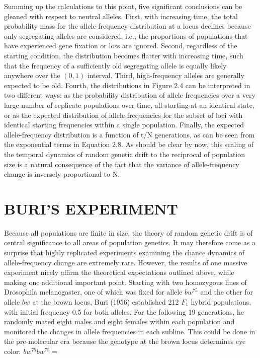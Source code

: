 \documentclass{article}
\begin{document}
Summing up the calculations to this point, five significant conclusions can be gleaned with respect to neutral alleles. First, with increasing time, the total probability mass for the allele-frequency distribution at a locus declines because only segregating alleles are considered, i.e., the proportions of populations that have experienced gene fixation or loss are ignored. Second, regardless of the starting condition, the distribution becomes flatter with increasing time, such that the frequency of a sufficiently old segregating allele is equally likely anywhere over the  $ (0,1) $ interval. Third, high-frequency alleles are generally expected to be old. Fourth, the distributions in Figure 2.4 can be interpreted in two different ways: as the probability distribution of allele frequencies over a very large number of replicate populations over time, all starting at an identical state, or as the expected distribution of allele frequencies for the subset of loci with identical starting frequencies within a single population. Finally, the expected allele-frequency distribution is a function of t/N generations, as can be seen from the exponential terms in Equation 2.8. As should be clear by now, this scaling of the temporal dynamics of random genetic drift to the reciprocal of population size is a natural consequence of the fact that the variance of allele-frequency change is inversely proportional to N.

\section{BURI'S EXPERIMENT}
Because all populations are finite in size, the theory of random genetic drift is of central significance to all areas of population genetics. It may therefore come as a surprise that highly replicated experiments examining the chance dynamics of allele-frequency change are extremely rare. However, the results of one massive experiment nicely affirm the theoretical expectations outlined above, while making one additional important point. Starting with two homozygous lines of Drosophila melanogaster, one of which was fixed for allele  $ bw^{75} $ and the other for allele  $ bw $ at the brown locus, Buri (1956) established 212  $ F_{1} $ hybrid populations, with initial frequency 0.5 for both alleles. For the following 19 generations, he randomly mated eight males and eight females within each population and monitored the changes in allele frequencies in each subline. This could be done in the pre-molecular era because the genotype at the brown locus determines eye color:  $ bw^{75}bw^{75} =  $
\end{document}

